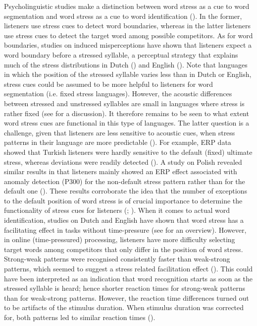 Psycholinguistic studies make a distinction between word stress as a cue to word segmentation and word stress as a cue to word identification (\citealt{cutler_prosody_1997}). In the former, listeners use stress cues to detect word boundaries, whereas in the latter listeners use stress cues to detect the target word among possible competitors. As for word boundaries, studies on induced misperceptions have shown that listeners expect a word boundary before a stressed syllable, a perceptual strategy that explains much of the stress distributions in Dutch (\citealt{vroomen_cues_1996}) and English (\citealt{cutler_rhythmic_1992}). Note that languages in which the position of the stressed syllable varies less than in Dutch or English, stress cues could be assumed to be more helpful to listeners for word segmentation (i.e. fixed stress languages). However, the acoustic differences between stressed and unstressed syllables are small in languages where stress is rather fixed (see \citealt[p.73]{cutler_lexical_2005} for a discussion). It therefore remains to be seen to what extent word stress cues are functional in this type of languages. The latter question is a challenge, given that listeners are less sensitive to acoustic cues, when stress patterns in their language are more predictable (\citealt{peperkamp_perception_2010}). For example, ERP data showed that Turkish listeners were hardly sensitive to the default (fixed) ultimate stress, whereas deviations were readily detected (\citealt{domahs_processing_2013}). A study on Polish revealed similar results in that listeners mainly showed an ERP effect associated with anomaly detection (P300) for the non-default stress pattern rather than for the default one (\citealt{domahs_stress_2012}). These results corroborate the idea that the number of exceptions to the default position of word stress is of crucial importance to determine the functionality of stress cues for listeners (\citealt{peperkamp_perception_2010}; \citealt{cutler_lexical_2005}). When it comes to actual word identification, studies on Dutch and English have shown that word stress has a facilitating effect in tasks without time-pressure (see \citealt{cutler_prosody_1997} for an overview). However, in online (time-pressured) processing, listeners have more difficulty selecting target words among competitors that only differ in the position of word stress. Strong-weak patterns were recognised consistently faster than weak-strong patterns, which seemed to suggest a stress related facilitation effect (\citealt{cutler_use_1984}). This could have been interpreted as an indication that word recognition starts as soon as the stressed syllable is heard; hence shorter reaction times for strong-weak patterns than for weak-strong patterns. However, the reaction time differences turned out to be artifacts of the stimulus duration. When stimulus duration was corrected for, both patterns led to similar reaction times (\citealt{cutler_use_1984}).

